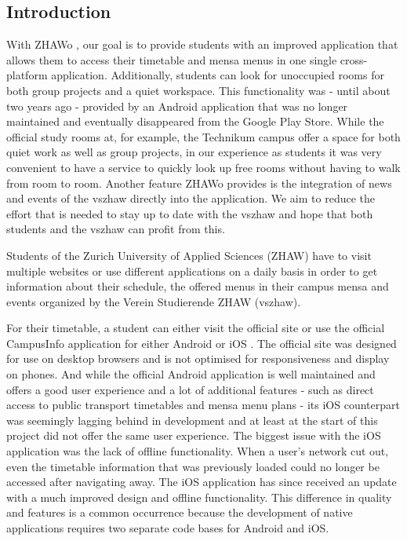 \begin{markdown}
\section{Introduction} \label{introduction}

With ZHAWo \cite{OurHost}, our goal is to provide students with an improved application that allows them to access their timetable and mensa menus in one single cross-platform application. Additionally, students can look for unoccupied rooms for both group projects and a quiet workspace. This functionality was - until about two years ago - provided by an Android application that was no longer maintained and eventually disappeared from the Google Play Store. While the official study rooms at, for example, the Technikum campus offer a space for both quiet work as well as group projects, in our experience as students it was very convenient to have a service to quickly look up free rooms without having to walk from room to room. Another feature ZHAWo provides is the integration of news \cite{VszhawNews} and events \cite{VszhawCalendar} of the vszhaw directly into the application. We aim to reduce the effort that is needed to stay up to date with the vszhaw and hope that both students and the vszhaw can profit from this.

Students of the Zurich University of Applied Sciences (ZHAW) have to visit multiple websites or use different applications on a daily basis in order to get information about their schedule, the offered menus in their campus mensa and events organized by the Verein Studierende ZHAW (vszhaw).

For their timetable, a student can either visit the official site \cite{Stundenplan} or use the official CampusInfo application for either Android \cite{AppAndroid} or iOS \cite{AppIOS}. The official site was designed for use on desktop browsers and is not optimised for responsiveness and display on phones. And while the official Android application is well maintained and offers a good user experience and a lot of additional features - such as direct access to public transport timetables and mensa menu plans - its iOS counterpart was seemingly lagging behind in development and at least at the start of this project did not offer the same user experience. The biggest issue with the iOS application was the lack of offline functionality. When a user's network cut out, even the timetable information that was previously loaded could no longer be accessed after navigating away. The iOS application has since received an update with a much improved design and offline functionality. This difference in quality and features is a common occurrence because the development of native applications requires two separate code bases for Android and iOS. 


\end{markdown}

